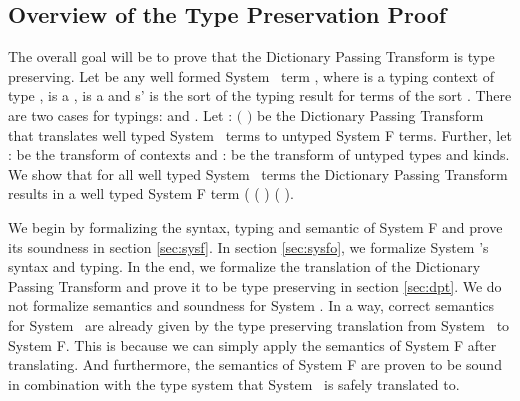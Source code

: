 \subsection{Overview of the Type Preservation Proof}\label{sec:ov}
The overall goal will be to prove that the Dictionary Passing Transform is type preserving. 
Let  be any well formed System \Fo\ term    \Constr{:} , where  is a typing context of type ,  is a  ,  is a   and s' is the sort of the typing result for terms of the sort . 
There are two cases for typings:    \Constr{:}  and    \Constr{:} .
Let  : $($   \Constr{:} $)$    be the Dictionary Passing Transform that translates well typed System \Fo\ terms to untyped System F terms. 
Further, let  :    be the transform of contexts and  :      be the transform of untyped types and kinds. 
We show that for all well typed System \Fo\  terms  the Dictionary Passing Transform results in a well typed System F term (   ( ) \Constr{:} ( ). 

\noindent We begin by formalizing the syntax, typing and semantic of System F and prove its soundness in section \ref{sec:sysf}. 
In section \ref{sec:sysfo}, we formalize System \Fo's syntax and typing. 
In the end, we formalize the translation of the Dictionary Passing Transform and prove it to be type preserving in section \ref{sec:dpt}. 
We do not formalize semantics and soundness for System \Fo. 
In a way, correct semantics for System \Fo\ are already given by the type preserving translation from System \Fo\ to System F. 
This is because we can simply apply the semantics of System F after translating. 
And furthermore, the semantics of System F are proven to be sound in combination with the type system that System \Fo\ is safely translated to.